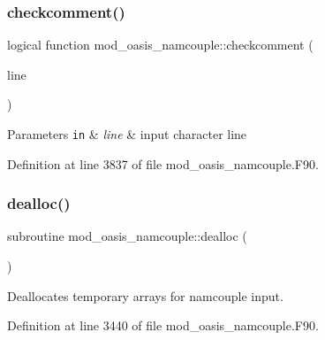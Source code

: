 \mbox{\label{namespacemod__oasis__namcouple_a4551fbe4bcd69bc6d0d4f6e1ee52ea86}} 
\subsubsection{\texorpdfstring{checkcomment()}{checkcomment()}}
{\footnotesize\ttfamily logical function mod\+\_\+oasis\+\_\+namcouple\+::checkcomment (\begin{DoxyParamCaption}\item[{character (len=$\ast$), intent(in)}]{line }\end{DoxyParamCaption})\hspace{0.3cm}{\ttfamily [private]}}


\begin{DoxyParams}[1]{Parameters}
\mbox{\tt in}  & {\em line} & input character line \\
\hline
\end{DoxyParams}


Definition at line 3837 of file mod\+\_\+oasis\+\_\+namcouple.\+F90.

\mbox{\label{namespacemod__oasis__namcouple_abf09a0e902f44f77874a75bb4a7fba33}} 
\subsubsection{\texorpdfstring{dealloc()}{dealloc()}}
{\footnotesize\ttfamily subroutine mod\+\_\+oasis\+\_\+namcouple\+::dealloc (\begin{DoxyParamCaption}{ }\end{DoxyParamCaption})\hspace{0.3cm}{\ttfamily [private]}}



Deallocates temporary arrays for namcouple input. 



Definition at line 3440 of file mod\+\_\+oasis\+\_\+namcouple.\+F90.

\mbox{\label{namespacemod__oasis__namcouple_a5f87ffd480c100a94dcdf02f69b23080}} 
